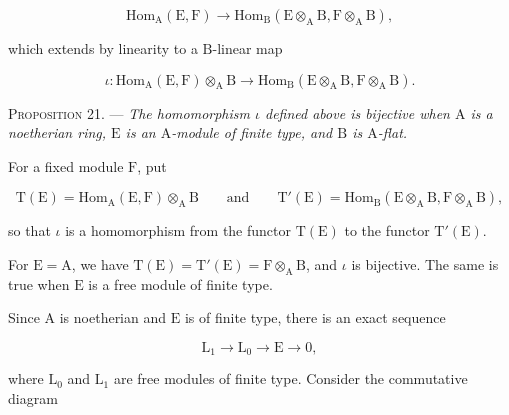 \begin{equation*}
\mathrm{Hom}_\mathrm{A}(\mathrm{E},\mathrm{F})\longrightarrow
\mathrm{Hom}_\mathrm{B}(\mathrm{E}\otimes_\mathrm{A}\mathrm{B},\mathrm{F}\otimes_\mathrm{A}\mathrm{B}),
\end{equation*}

which extends by linearity to a $\mathrm{B}$-linear map

\begin{equation*}
\iota:\mathrm{Hom}_\mathrm{A}(\mathrm{E},\mathrm{F})\otimes_\mathrm{A}\mathrm{B}\longrightarrow
\mathrm{Hom}_\mathrm{B}(\mathrm{E}\otimes_\mathrm{A}\mathrm{B},\mathrm{F}\otimes_\mathrm{A}\mathrm{B}).
\end{equation*}

\textsc{Proposition 21}. --- \emph{The homomorphism
$\iota$ defined above is bijective when $\mathrm{A}$ is a noetherian ring, $\mathrm{E}$ is an
$\mathrm{A}$-module of finite type, and $\mathrm{B}$ is $\mathrm{A}$-flat.}

For a fixed module $\mathrm{F}$, put

\begin{equation*}
\mathrm{T}(\mathrm{E})=\mathrm{Hom}_\mathrm{A}(\mathrm{E},\mathrm{F})\otimes_\mathrm{A}\mathrm{B}
\qquad\text{and}\qquad
\mathrm{T}'(\mathrm{E})=\mathrm{Hom}_\mathrm{B}(\mathrm{E}\otimes_\mathrm{A}\mathrm{B},\mathrm{F}\otimes_\mathrm{A}\mathrm{B}),
\end{equation*}

so that $\iota$ is a homomorphism from the functor $\mathrm{T}(\mathrm{E})$ to the functor
$\mathrm{T}'(\mathrm{E})$.

For $\mathrm{E}=\mathrm{A}$, we have $\mathrm{T}(\mathrm{E})=\mathrm{T}'(\mathrm{E})=\mathrm{F}\otimes_\mathrm{A}\mathrm{B}$, and $\iota$ is bijective. The
same is true when $\mathrm{E}$ is a free module of finite type.

Since $\mathrm{A}$ is noetherian and $\mathrm{E}$ is of finite type, there is an exact sequence

\begin{equation*}
\mathrm{L}_1\longrightarrow \mathrm{L}_0\longrightarrow \mathrm{E}\longrightarrow0,
\end{equation*}

where $\mathrm{L}_0$ and $\mathrm{L}_1$ are free modules of finite type. Consider the
commutative diagram

\begin{center}
\end{center}

